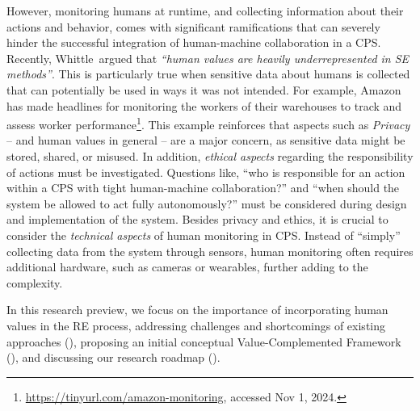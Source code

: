 
However, monitoring humans at runtime, and collecting information about their actions and behavior, comes with significant ramifications that can severely hinder the successful integration of human-machine collaboration in a CPS. Recently, Whittle~ argued that \emph{\enquote{human values are heavily underrepresented in SE methods}}.
This is particularly true when sensitive data about humans is collected that can potentially be used in ways it was not intended. For example, Amazon has made headlines for monitoring the workers of their warehouses to track and assess worker performance\footnote{\url{https://tinyurl.com/amazon-monitoring}, accessed Nov 1, 2024.}.
This example reinforces that aspects such as \emph{Privacy} -- and human values in general -- are a major concern, as sensitive data might be stored, shared, or misused. In addition, \textit{ethical aspects} regarding the responsibility of actions must be investigated. 
Questions like, ``who is responsible for an action within a CPS with tight human-machine collaboration?'' and ``when should the system be allowed to act fully autonomously?'' must be considered during design and implementation of the system.
Besides privacy and ethics, it is crucial to consider the \textit{technical aspects} of human monitoring in CPS. Instead of ``simply'' collecting data from the system through sensors, human monitoring often requires additional hardware, such as cameras or wearables, further adding to the complexity.  %

In this research preview, we focus on the importance of incorporating human values in the RE process, addressing challenges and shortcomings of existing approaches (),  proposing an initial conceptual Value-Complemented Framework (), and discussing our research roadmap ().




